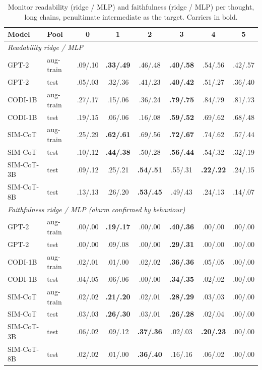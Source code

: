 \begin{table}[htbp]
\caption{Monitor readability (ridge / MLP) and faithfulness (ridge / MLP) per thought, long chains, penultimate intermediate as the target. Carriers in bold.}
\label{tab:monitors}
\centering
\scriptsize
\setlength{\tabcolsep}{3pt}
\begin{tabular}{llcccccc}
\toprule
Model & Pool & 0 & 1 & 2 & 3 & 4 & 5 \\
\midrule
\multicolumn{8}{l}{\emph{Readability ridge / MLP}} \\
GPT-2 & aug-train & .09/.10 & \textbf{.33/.49} & .46/.48 & \textbf{.40/.58} & .54/.56 & .42/.57 \\
GPT-2 & test & .05/.03 & .32/.36 & .41/.23 & \textbf{.40/.42} & .51/.27 & .36/.40 \\
CODI-1B & aug-train & .27/.17 & .15/.06 & .36/.24 & \textbf{.79/.75} & .84/.79 & .81/.73 \\
CODI-1B & test & .19/.15 & .06/.06 & .16/.08 & \textbf{.59/.52} & .69/.62 & .68/.48 \\
SIM-CoT & aug-train & .25/.29 & \textbf{.62/.61} & .69/.56 & \textbf{.72/.67} & .74/.62 & .57/.44 \\
SIM-CoT & test & .10/.12 & \textbf{.44/.38} & .50/.28 & \textbf{.56/.44} & .54/.32 & .32/.19 \\
SIM-CoT-3B & test & .09/.12 & .25/.21 & \textbf{.54/.51} & .55/.31 & \textbf{.22/.22} & .24/.15 \\
SIM-CoT-8B & test & .13/.13 & .26/.20 & \textbf{.53/.45} & .49/.43 & .24/.13 & .14/.07 \\
\midrule
\multicolumn{8}{l}{\emph{Faithfulness ridge / MLP (alarm confirmed by behaviour)}} \\
GPT-2 & aug-train & .00/.00 & \textbf{.19/.17} & .00/.00 & \textbf{.40/.36} & .00/.00 & .00/.00 \\
GPT-2 & test & .00/.00 & .09/.08 & .00/.00 & \textbf{.29/.31} & .00/.00 & .00/.00 \\
CODI-1B & aug-train & .02/.01 & .01/.00 & .02/.02 & \textbf{.36/.36} & .05/.05 & .00/.00 \\
CODI-1B & test & .04/.05 & .06/.06 & .00/.00 & \textbf{.34/.35} & .02/.02 & .00/.00 \\
SIM-CoT & aug-train & .02/.02 & \textbf{.21/.20} & .02/.01 & \textbf{.28/.29} & .03/.03 & .00/.00 \\
SIM-CoT & test & .03/.03 & \textbf{.26/.30} & .03/.01 & \textbf{.26/.28} & .02/.04 & .00/.00 \\
SIM-CoT-3B & test & .06/.02 & .09/.12 & \textbf{.37/.36} & .02/.03 & \textbf{.20/.23} & .00/.00 \\
SIM-CoT-8B & test & .02/.02 & .01/.00 & \textbf{.36/.40} & .16/.16 & .06/.02 & .00/.00 \\
\bottomrule
\end{tabular}
\end{table}

